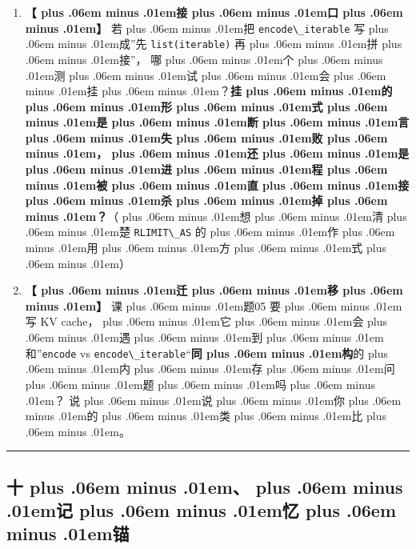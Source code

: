 \documentclass[
]{article}
\newcommand{\passthrough}[1]{#1}
\def\zh#1{{\zhfont #1}}
\def\zhglue{\hskip0pt plus .06em minus .01em}
\begin{document}
\begin{enumerate}
\item
  \textbf{\zh{【\zhglue 接\zhglue 口\zhglue 】}} \zh{若\zhglue 把} \passthrough{\lstinline!encode\_iterable!} \zh{写\zhglue 成}''\zh{先} \passthrough{\lstinline!list(iterable)!} \zh{再\zhglue 拼\zhglue 接}''\zh{，} \zh{哪\zhglue 个\zhglue 测\zhglue 试\zhglue 会\zhglue 挂\zhglue ？}\textbf{\zh{挂\zhglue 的\zhglue 形\zhglue 式\zhglue 是\zhglue 断\zhglue 言\zhglue 失\zhglue 败\zhglue ，\zhglue 还\zhglue 是\zhglue 进\zhglue 程\zhglue 被\zhglue 直\zhglue 接\zhglue 杀\zhglue 掉\zhglue ？}}\zh{（\zhglue 想\zhglue 清\zhglue 楚} \passthrough{\lstinline!RLIMIT\_AS!} \zh{的\zhglue 作\zhglue 用\zhglue 方\zhglue 式\zhglue ）}
\item
  \textbf{\zh{【\zhglue 迁\zhglue 移\zhglue 】}} \zh{课\zhglue 题}05 \zh{要\zhglue 写} KV cache\zh{，\zhglue 它\zhglue 会\zhglue 遇\zhglue 到\zhglue 和}''\passthrough{\lstinline!encode!} vs \passthrough{\lstinline!encode\_iterable!}``\textbf{\zh{同\zhglue 构}}\zh{的\zhglue 内\zhglue 存\zhglue 问\zhglue 题\zhglue 吗\zhglue ？} \zh{说\zhglue 说\zhglue 你\zhglue 的\zhglue 类\zhglue 比\zhglue 。}
\end{enumerate}

\begin{center}\rule{0.5\linewidth}{0.5pt}\end{center}

\subsection{\zh{十\zhglue 、\zhglue 记\zhglue 忆\zhglue 锚}}\label{ux5341ux8bb0ux5fc6ux951a}
\end{document}
